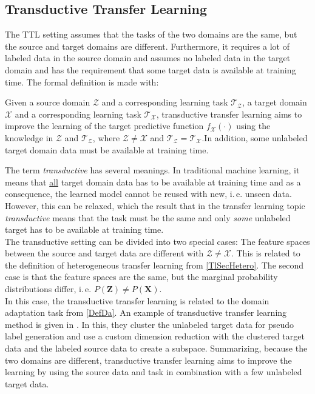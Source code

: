 \subsection{Transductive Transfer Learning}\label{TlSubSecTrans}
The \ac{TTL} setting assumes that the tasks of the two domains are the same, but the source and target domains are different.
Furthermore, it requires a lot of labeled data in the source domain and assumes no labeled data in the target domain and has the requirement that some target data is available at training time.\cite{Pan.2010}
The formal definition is made with:
\begin{mDef}\label{DefTTL}
	 Given a source domain $\mathcal{Z}$ and a corresponding learning task $\mathcal{T_Z}$, a target domain $\mathcal{X}$ and a corresponding learning task $\mathcal{T_X}$, transductive transfer learning aims to improve the learning of the target predictive function $f_\mathcal{X}(\cdot)$ using the knowledge in $\mathcal{Z}$ and $\mathcal{T_Z}$, where $\mathcal{Z} \neq \mathcal{X}$ and $\mathcal{T_Z} = \mathcal{T_X}$.In addition, some unlabeled target domain data must be available at training time.
\end{mDef}
The term \textit{transductive} has several meanings.
In traditional machine learning, it means that \underline{all} target domain data has to be available at training time and as a consequence, the learned model cannot be reused with new, i.\,e. unseen data.
However, this can be relaxed, which the result that in the transfer learning topic \textit{transductive} means that the task must be the same and only \textit{some} unlabeled target has to be available at training time.\cite{Pan.2010}\\
The transductive setting can be divided into two special cases:
The feature spaces between the source and target data are different with $\mathcal{Z} \neq \mathcal{X}$.
This is related to the definition of heterogeneous transfer learning from \ref{TlSecHetero}.
The second case is that the feature spaces are the same, but the marginal probability distributions differ, i.\,e. $P(\mathbf{Z}) \neq P(\mathbf{X})$.\cite{Pan.2010}\\
In this case, the transductive transfer learning is related to the domain adaptation task from \ref{DefDa}.
An example of transductive transfer learning method is given in \cite{Wang.2008}.
In this, they cluster the unlabeled target data for pseudo label generation and use a custom dimension reduction with the clustered target data and the labeled source data to create a subspace.
Summarizing, because the two domains are different, transductive transfer learning aims to improve the learning by using the source data and task in combination with a few unlabeled target data.

